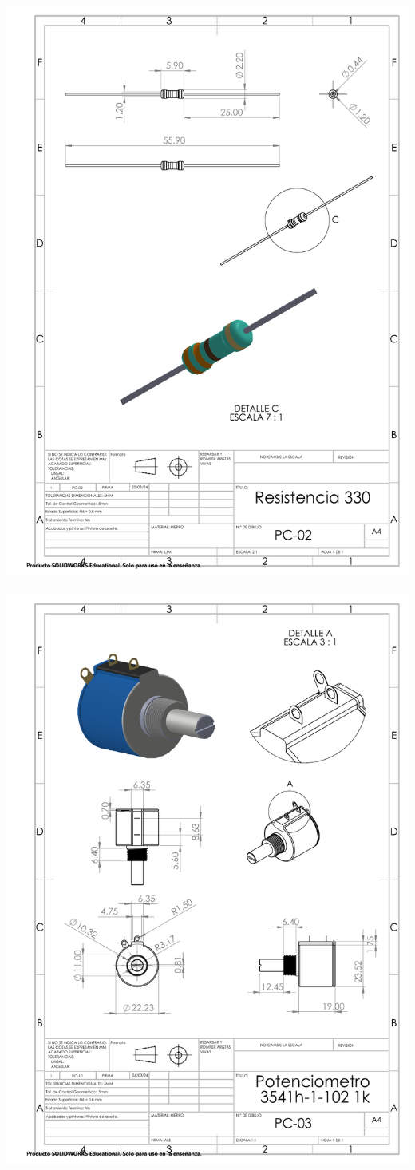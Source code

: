 \begin{center}
\includegraphics[width=.9\textwidth]{22/img/resistenciasDibujo.PDF}~\\[15cm]

\includegraphics[width=.9\textwidth]{22/img/potenciometroDibujo.PDF}~\\[15cm]


\end{center}
